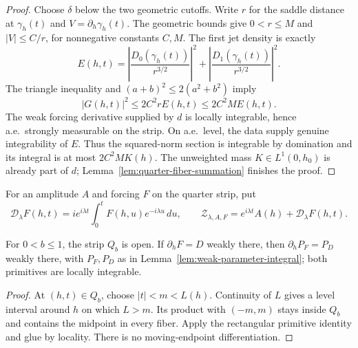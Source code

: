 \begin{proof}
\leanok
Choose $\delta$ below the two geometric cutoffs.
Write $r$ for the saddle distance at $\gamma_h(t)$ and
$V=\partial_h\gamma_h(t)$.
The geometric bounds give $0<r\le M$ and $|V|\le C/r$, for
nonnegative constants $C,M$. The first jet density is exactly
\[
 E(h,t)=\left|\frac{D_0(\gamma_h(t))}{r^{3/2}}\right|^2+
         \left|\frac{D_1(\gamma_h(t))}{r^{3/2}}\right|^2.
\]
The triangle inequality and $(a+b)^2\le2(a^2+b^2)$ imply
\[
 |G(h,t)|^2\le 2C^2rE(h,t)\le2C^2ME(h,t).
\]
The weak forcing derivative supplied by $d$ is locally integrable,
hence a.e.\ strongly measurable on the strip.
On a.e.\ level, the data supply genuine integrability of $E$.
Thus the squared-norm section is integrable by domination and its
integral is at most $2C^2M K(h)$.
The unweighted mass $K\in L^1(0,h_0)$ is already part of $d$;
Lemma~\ref{lem:quarter-fiber-summation} finishes the proof.
\end{proof}

\begin{definition}
\label{def:quarter-reconstruction}
\leanok
For an amplitude $A$ and forcing $F$ on the quarter strip, put
\[
 \mathcal D_\lambda F(h,t)
 =i e^{i\lambda t}\int_0^t F(h,u)e^{-i\lambda u}\,du,\qquad
 \mathcal Z_{\lambda,A,F}=e^{i\lambda t}A(h)+\mathcal D_\lambda F(h,t).
\]
\end{definition}

\begin{lemma}
\label{lem:quarter-primitive-weak}
\leanok
For $0<b\le1$, the strip $Q_b$ is open. If $\partial_hF=D$ weakly there,
then $\partial_hP_F=P_D$ weakly there, with $P_F,P_D$ as in
Lemma~\ref{lem:weak-parameter-integral}; both primitives are locally integrable.
\end{lemma}

\begin{proof}
\leanok
At $(h,t)\in Q_b$, choose $|t|<m<L(h)$.
Continuity of $L$ gives a level interval around $h$ on which $L>m$.
Its product with $(-m,m)$ stays inside $Q_b$ and contains the midpoint
in every fiber. Apply the rectangular primitive identity and glue by
locality. There is no moving-endpoint differentiation.
\end{proof}

